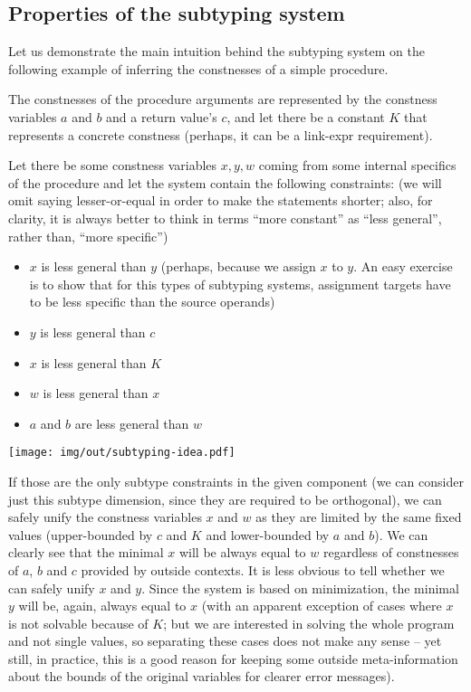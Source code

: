 \subsection{Properties of the subtyping system}
\label{subtyping-idea}

Let us demonstrate the main intuition behind the subtyping system on the following example of inferring the constnesses of a simple procedure.

The constnesses of the procedure arguments are represented by the constness variables $a$ and $b$ and a return value's $c$, and let there be a constant $K$ that represents a concrete constness (perhaps, it can be a link-expr requirement).

Let there be some constness variables $x, y, w$ coming from some internal specifics of the procedure and let the system contain the following constraints: (we will omit saying lesser-or-equal in order to make the statements shorter; also, for clarity, it is always better to think in terms ``more constant'' as ``less general'', rather than, ``more specific'')

\begin{itemize}
    \item $x$ is less general than $y$ (perhaps, because we assign $x$ to $y$. An easy exercise is to show that for this types of subtyping systems, assignment targets have to be less specific than the source operands)
    \item $y$ is less general than $c$
    \item $x$ is less general than $K$
    \item $w$ is less general than $x$
    \item $a$ and $b$ are less general than $w$
\end{itemize}

\centerline{\texttt{[image: img/out/subtyping-idea.pdf]}}

If those are the only subtype constraints in the given component (we can consider just this subtype dimension, since they are required to be orthogonal), we can safely unify the constness variables $x$ and $w$ as they are limited by the same fixed values (upper-bounded by $c$ and $K$ and lower-bounded by $a$ and $b$). We can clearly see that the minimal $x$ will be always equal to $w$ regardless of constnesses of $a$, $b$ and $c$ provided by outside contexts. It is less obvious to tell whether we can safely unify $x$ and $y$. Since the system is based on minimization, the minimal $y$ will be, again, always equal to $x$ (with an apparent exception of cases where $x$ is not solvable because of $K$; but we are interested in solving the whole program and not single values, so separating these cases does not make any sense -- yet still, in practice, this is a good reason for keeping some outside meta-information about the bounds of the original variables for clearer error messages).

